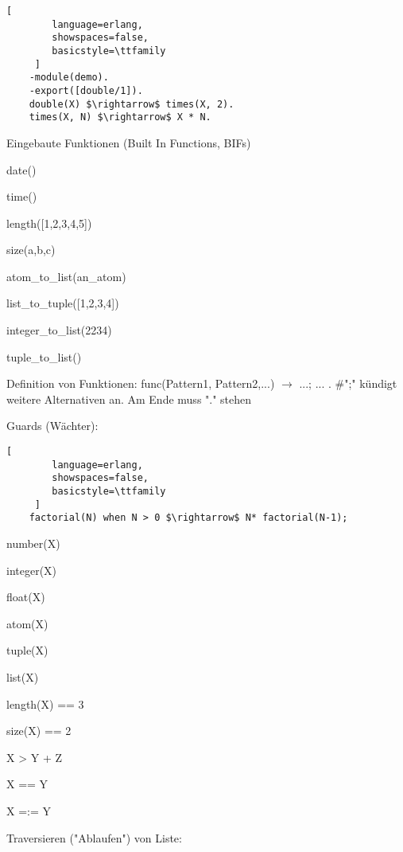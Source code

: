 \documentclass[10pt]{article}
\begin{document}
\begin{itemize*}
\begin{itemize*}
\begin{lstlisting}[
        language=erlang,
        showspaces=false,
        basicstyle=\ttfamily
     ]
    -module(demo).
    -export([double/1]).
    double(X) $\rightarrow$ times(X, 2).
    times(X, N) $\rightarrow$ X * N.
    \end{lstlisting}
  \item Eingebaute Funktionen (Built In Functions, BIFs)
  \begin{itemize*}
    \item date()
    \item time()
    \item length([1,2,3,4,5])
    \item size({a,b,c})
    \item atom\_to\_list(an\_atom)
    \item list\_to\_tuple([1,2,3,4])
    \item integer\_to\_list(2234)
    \item tuple\_to\_list({})
  \end{itemize*}
  \item Definition von Funktionen: func(Pattern1, Pattern2,...) $\rightarrow$ ...; ... . \#";" kündigt weitere Alternativen an. Am Ende muss "." stehen
  \item Guards (Wächter):
  \begin{lstlisting}[
        language=erlang,
        showspaces=false,
        basicstyle=\ttfamily
     ]
    factorial(N) when N > 0 $\rightarrow$ N* factorial(N-1);
    \end{lstlisting}
  \begin{itemize*}
    \item number(X)   %
    \item integer(X)  %
    \item float(X)    %
    \item atom(X)     %
    \item tuple(X)    %
    \item list(X)     %
    \item length(X) == 3  %
    \item size(X) == 2    %
    \item X > Y + Z   %
    \item X == Y  %
    \item X =:= Y %
  \end{itemize*}
  \item Traversieren ("Ablaufen") von Liste:
  \begin{itemize*}

\end{itemize*}
\end{itemize*}
\end{itemize*}
\end{document}
